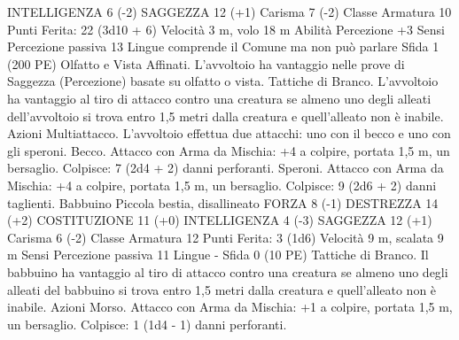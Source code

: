 \begin{multicols}{2}
INTELLIGENZA 6 (-2)
SAGGEZZA 12 (+1)
Carisma 7 (-2)
Classe Armatura 10
\hspace*{0pt}\hfill{Punti Ferita}: 22 (3d10 + 6)
Velocità 3 m, volo 18 m
Abilità Percezione +3
Sensi Percezione passiva 13
Lingue comprende il Comune ma non può parlare
Sfida 1 (200 PE)
Olfatto e Vista Affinati. L’avvoltoio ha vantaggio nelle prove di
Saggezza (Percezione) basate su olfatto o vista.
Tattiche di Branco. L’avvoltoio ha vantaggio al tiro di attacco
contro una creatura se almeno uno degli alleati dell’avvoltoio si
trova entro 1,5 metri dalla creatura e quell’alleato non è inabile.
Azioni
Multiattacco. L’avvoltoio effettua due attacchi: uno con il becco
e uno con gli speroni.
Becco. Attacco con Arma da Mischia: +4 a colpire, portata 1,5
m, un bersaglio.
Colpisce: 7 (2d4 + 2) danni perforanti.
Speroni. Attacco con Arma da Mischia: +4 a colpire, portata 1,5
m, un bersaglio.
Colpisce: 9 (2d6 + 2) danni taglienti.
Babbuino
Piccola bestia, disallineato
FORZA 8 (-1)
DESTREZZA 14 (+2)
COSTITUZIONE 11 (+0)
INTELLIGENZA 4 (-3)
SAGGEZZA 12 (+1)
Carisma 6 (-2)
Classe Armatura 12
\hspace*{0pt}\hfill{Punti Ferita}: 3 (1d6)
Velocità 9 m, scalata 9 m
Sensi Percezione passiva 11
Lingue -
Sfida 0 (10 PE)
Tattiche di Branco. Il babbuino ha vantaggio al tiro di attacco
contro una creatura se almeno uno degli alleati del babbuino si
trova entro 1,5 metri dalla creatura e quell’alleato non è inabile.
Azioni
Morso. Attacco con Arma da Mischia: +1 a colpire, portata 1,5
m, un bersaglio.
Colpisce: 1 (1d4 - 1) danni perforanti.
 

\end{multicols}
